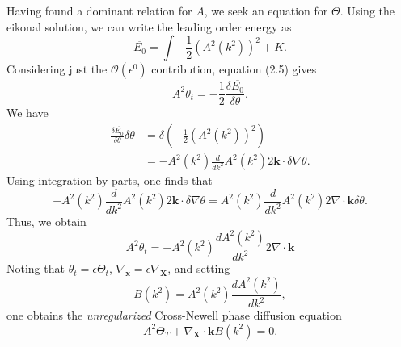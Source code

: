 \documentclass[12pt]{article}
\numberwithin{equation}{section}
\begin{document}
\par Having found a dominant relation for $A$, we seek an equation for $\Theta$. Using the eikonal solution, we can write the leading order energy as 
\begin{equation}
    \overline{E_0} = \int - \frac{1}{2}\left( A^2(k^2) \right)^2 + K.
\end{equation}
Considering just the $\mathcal{O}(\epsilon^0)$ contribution, equation (2.5) gives 
\begin{equation}
    A^2 \theta_t = -\frac{1}{2}\frac{\delta \overline{E_0}}{\delta \theta}.
\end{equation}
We have
\begin{align*}
    \frac{\delta \overline{E_0}}{\delta \theta}\delta \theta &= \delta\left( -\frac{1}{2}(A^2(k^2))^2\right)\\
                                                             &= -A^2(k^2)\frac{d}{dk^2}A^2(k^2)2\bm{k}\cdot \delta \nabla \theta.
\end{align*}
Using integration by parts, one finds that
\begin{equation*}
    -A^2(k^2)\frac{d}{dk^2}A^2(k^2)2\bm{k}\cdot \delta \nabla \theta = A^2(k^2)\frac{d}{dk^2}A^2(k^2)2\nabla \cdot \bm{k}\delta \theta.
\end{equation*}
Thus, we obtain
\begin{equation*}
    A^2 \theta_t = -A^2(k^2)\frac{dA^2(k^2)}{dk^2}2\nabla\cdot\bm{k}
\end{equation*}
Noting that $\theta_t = \epsilon \Theta_t$, $\nabla_{\bm{x}}=\epsilon\nabla_{\bm{X}}$, and setting
\begin{equation}
    B(k^2) = A^2(k^2)\frac{dA^2(k^2)}{dk^2},
\end{equation}
one obtains the \emph{unregularized} Cross-Newell phase diffusion equation
\begin{equation}
    A^2\Theta_T + \nabla_{\bm{X}}\cdot \bm{k}B(k^2) = 0.
\end{equation}
\end{document}
